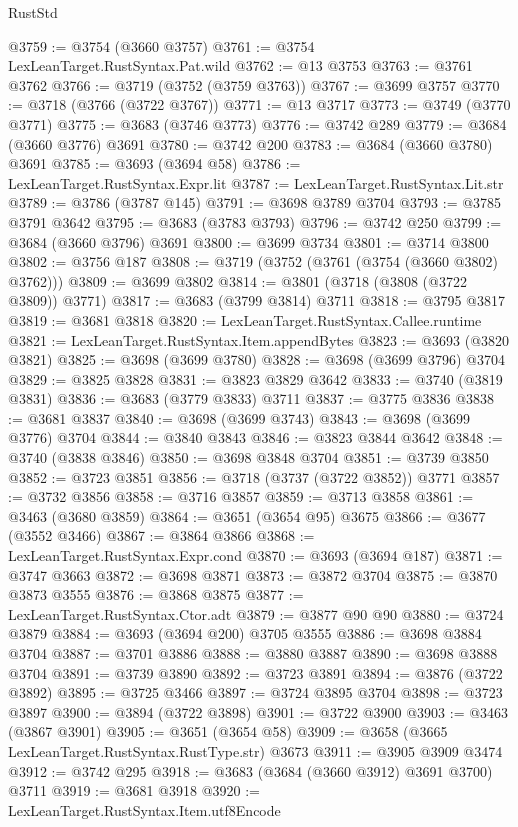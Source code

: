 \begin{lexlean}{RustStd}
\begin{coremodule}
@3759 := @3754 (@3660 @3757)
@3761 := @3754 LexLeanTarget.RustSyntax.Pat.wild
@3762 := @13 @3753
@3763 := @3761 @3762
@3766 := @3719 (@3752 (@3759 @3763))
@3767 := @3699 @3757
@3770 := @3718 (@3766 (@3722 @3767))
@3771 := @13 @3717
@3773 := @3749 (@3770 @3771)
@3775 := @3683 (@3746 @3773)
@3776 := @3742 @289
@3779 := @3684 (@3660 @3776) @3691
@3780 := @3742 @200
@3783 := @3684 (@3660 @3780) @3691
@3785 := @3693 (@3694 @58)
@3786 := LexLeanTarget.RustSyntax.Expr.lit
@3787 := LexLeanTarget.RustSyntax.Lit.str
@3789 := @3786 (@3787 @145)
@3791 := @3698 @3789 @3704
@3793 := @3785 @3791 @3642
@3795 := @3683 (@3783 @3793)
@3796 := @3742 @250
@3799 := @3684 (@3660 @3796) @3691
@3800 := @3699 @3734
@3801 := @3714 @3800
@3802 := @3756 @187
@3808 := @3719 (@3752 (@3761 (@3754 (@3660 @3802) @3762)))
@3809 := @3699 @3802
@3814 := @3801 (@3718 (@3808 (@3722 @3809)) @3771)
@3817 := @3683 (@3799 @3814) @3711
@3818 := @3795 @3817
@3819 := @3681 @3818
@3820 := LexLeanTarget.RustSyntax.Callee.runtime
@3821 := LexLeanTarget.RustSyntax.Item.appendBytes
@3823 := @3693 (@3820 @3821)
@3825 := @3698 (@3699 @3780)
@3828 := @3698 (@3699 @3796) @3704
@3829 := @3825 @3828
@3831 := @3823 @3829 @3642
@3833 := @3740 (@3819 @3831)
@3836 := @3683 (@3779 @3833) @3711
@3837 := @3775 @3836
@3838 := @3681 @3837
@3840 := @3698 (@3699 @3743)
@3843 := @3698 (@3699 @3776) @3704
@3844 := @3840 @3843
@3846 := @3823 @3844 @3642
@3848 := @3740 (@3838 @3846)
@3850 := @3698 @3848 @3704
@3851 := @3739 @3850
@3852 := @3723 @3851
@3856 := @3718 (@3737 (@3722 @3852)) @3771
@3857 := @3732 @3856
@3858 := @3716 @3857
@3859 := @3713 @3858
@3861 := @3463 (@3680 @3859)
@3864 := @3651 (@3654 @95) @3675
@3866 := @3677 (@3552 @3466)
@3867 := @3864 @3866
@3868 := LexLeanTarget.RustSyntax.Expr.cond
@3870 := @3693 (@3694 @187)
@3871 := @3747 @3663
@3872 := @3698 @3871
@3873 := @3872 @3704
@3875 := @3870 @3873 @3555
@3876 := @3868 @3875
@3877 := LexLeanTarget.RustSyntax.Ctor.adt
@3879 := @3877 @90 @90
@3880 := @3724 @3879
@3884 := @3693 (@3694 @200) @3705 @3555
@3886 := @3698 @3884 @3704
@3887 := @3701 @3886
@3888 := @3880 @3887
@3890 := @3698 @3888 @3704
@3891 := @3739 @3890
@3892 := @3723 @3891
@3894 := @3876 (@3722 @3892)
@3895 := @3725 @3466
@3897 := @3724 @3895 @3704
@3898 := @3723 @3897
@3900 := @3894 (@3722 @3898)
@3901 := @3722 @3900
@3903 := @3463 (@3867 @3901)
@3905 := @3651 (@3654 @58)
@3909 := @3658 (@3665 LexLeanTarget.RustSyntax.RustType.str) @3673
@3911 := @3905 @3909 @3474
@3912 := @3742 @295
@3918 := @3683 (@3684 (@3660 @3912) @3691 @3700) @3711
@3919 := @3681 @3918
@3920 := LexLeanTarget.RustSyntax.Item.utf8Encode

\end{coremodule}
\end{lexlean}
